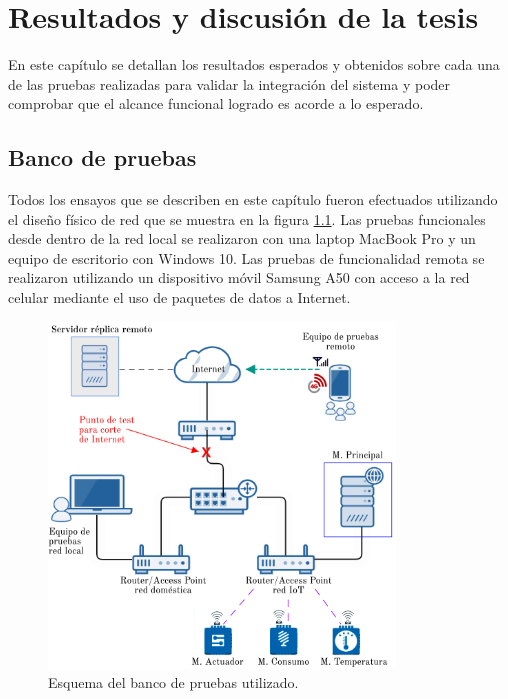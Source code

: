 
\chapter{Resultados y discusión de la tesis} %

\label{Chapter4} %


En este capítulo se detallan los resultados esperados y obtenidos sobre cada una de las pruebas realizadas para validar la integración del sistema y poder comprobar que el alcance funcional logrado es acorde a lo esperado.


\section{Banco de pruebas}

Todos los ensayos que se describen en este capítulo fueron efectuados utilizando el diseño físico de red que se muestra en la figura \ref{fig:banco}. Las pruebas funcionales desde dentro de la red local se realizaron con una laptop MacBook Pro y un equipo de escritorio con Windows 10. Las pruebas de funcionalidad remota se realizaron utilizando un dispositivo móvil Samsung A50 con acceso a la red celular mediante el uso de paquetes de datos a Internet.

\begin{figure}[htbp]
	\centering
	\includegraphics[width=0.82\textwidth]{./Figures/banco2.png}
	\caption{Esquema del banco de pruebas utilizado.}

	\label{fig:banco}
\end{figure}

